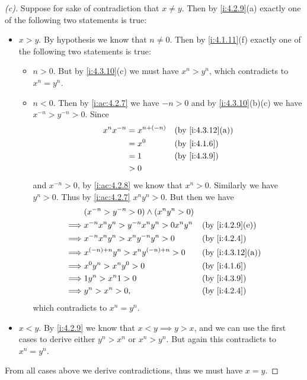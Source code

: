 \begin{proof}[(c)]
  Suppose for sake of contradiction that \(x \neq y\).
  Then by \cref{i:4.2.9}(a) exactly one of the following two statements is true:
  \begin{itemize}
    \item \(x > y\).
          By hypothesis we know that \(n \neq 0\).
          Then by \cref{i:4.1.11}(f) exactly one of the following two statements is true:
          \begin{itemize}
            \item \(n > 0\).
                  But by \cref{i:4.3.10}(c) we must have \(x^n > y^n\), which contradicts to \(x^n = y^n\).
            \item \(n < 0\).
                  Then by \cref{i:ac:4.2.7} we have \(-n > 0\) and by \cref{i:4.3.10}(b)(c) we have \(x^{-n} > y^{-n} > 0\).
                  Since
                  \begin{align*}
                    x^n x^{-n} & = x^{n + (-n)} &  & \by{i:4.3.12}[a] \\
                               & = x^0          &  & \by{i:4.1.6}     \\
                               & = 1            &  & \by{i:4.3.9}     \\
                               & > 0
                  \end{align*}
                  and \(x^{-n} > 0\), by \cref{i:ac:4.2.8} we know that \(x^n > 0\).
                  Similarly we have \(y^n > 0\).
                  Thus by \cref{i:ac:4.2.7} \(x^n y^n > 0\).
                  But then we have
                  \begin{align*}
                             & (x^{-n} > y^{-n} > 0) \land (x^n y^n > 0)                         \\
                    \implies & x^{-n} x^n y^n > y^{-n} x^n y^n > 0 x^n y^n &  & \by{i:4.2.9}[e]  \\
                    \implies & x^{-n} x^n y^n > x^n y^{-n} y^n > 0         &  & \by{i:4.2.4}     \\
                    \implies & x^{(-n) + n} y^n > x^n y^{(-n) + n} > 0     &  & \by{i:4.3.12}[a] \\
                    \implies & x^0 y^n > x^n y^0 > 0                       &  & \by{i:4.1.6}     \\
                    \implies & 1 y^n > x^n 1 > 0                           &  & \by{i:4.3.9}     \\
                    \implies & y^n > x^n > 0,                              &  & \by{i:4.2.4}
                  \end{align*}
                  which contradicts to \(x^n = y^n\).
          \end{itemize}
    \item \(x < y\).
          By \cref{i:4.2.9} we know that \(x < y \implies y > x\), and we can use the first cases to derive either \(y^n > x^n\) or \(x^n > y^n\).
          But again this contradicts to \(x^n = y^n\).
  \end{itemize}
  From all cases above we derive contradictions, thus we must have \(x = y\).
\end{proof}

